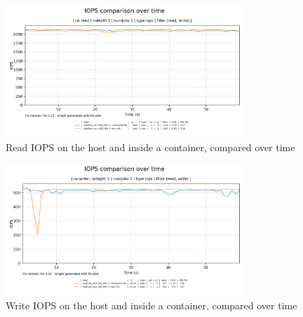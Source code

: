 \begin{figure}[H]
    \centering
    \includegraphics[width=0.8\textwidth]{images/results/sandisk-libaio-iops-read-comparison.png}
    \caption{Read IOPS on the host and inside a container, compared over time}
    \label{ch:experiment/problem-a/test/read-iops-over-time}
\end{figure}
\begin{figure}[H]
    \centering
    \includegraphics[width=0.8\textwidth]{images/results/sandisk-libaio-iops-write-comparison-2.png}
    \caption{Write IOPS on the host and inside a container, compared over time}
    \label{ch:experiment/problem-a/test/write-iops-over-time}
\end{figure}

